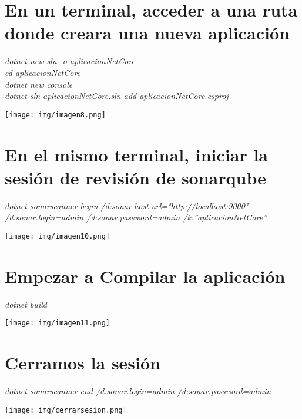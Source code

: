 \documentclass[12pt,letterpaper]{article}
\begin{document}
\section{En un terminal, acceder a una ruta donde creara una nueva aplicación} 
\textit{dotnet new sln -o aplicacionNetCore
\\cd aplicacionNetCore
\\dotnet new console
\\dotnet sln aplicacionNetCore.sln add aplicacionNetCore.csproj}
        \begin{center}
            \texttt{[image: img/imagen8.png]}  
        \end{center}


\section{En el mismo terminal, iniciar la sesión de revisión de sonarqube} 
\textit{dotnet sonarscanner begin /d:sonar.host.url="http://localhost:9000" /d:sonar.login=admin /d:sonar.password=admin /k:”aplicacionNetCore”}
        \begin{center}
                    \texttt{[image: img/imagen10.png]}  
        \end{center}

\section{Empezar a  Compilar la aplicación} 
\textit{dotnet build}
        \begin{center}
            \texttt{[image: img/imagen11.png]}  
        \end{center}

\newpage
\section{Cerramos la sesión} 
\textit{dotnet sonarscanner end /d:sonar.login=admin /d:sonar.password=admin}
        \begin{center}
                    \texttt{[image: img/cerrarsesion.png]}  
        \end{center}
\end{document}

